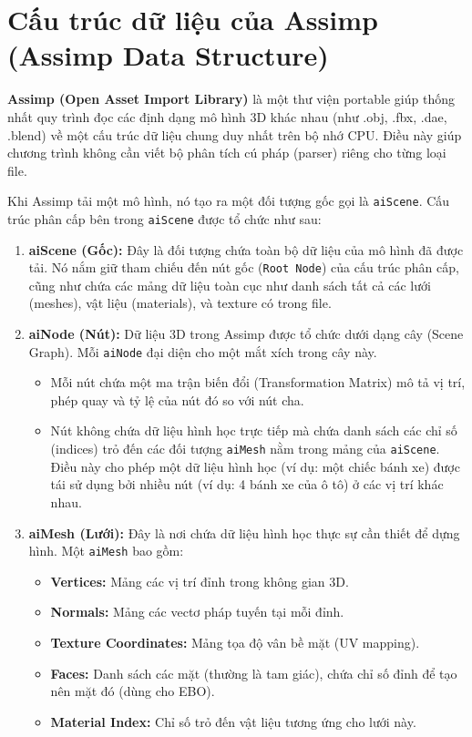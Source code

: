\section{Cấu trúc dữ liệu của Assimp (Assimp Data Structure)}

\textbf{Assimp (Open Asset Import Library)} là một thư viện portable giúp thống nhất quy trình đọc các định dạng mô hình 3D khác nhau (như .obj, .fbx, .dae, .blend) về một cấu trúc dữ liệu chung duy nhất trên bộ nhớ CPU. Điều này giúp chương trình không cần viết bộ phân tích cú pháp (parser) riêng cho từng loại file.

Khi Assimp tải một mô hình, nó tạo ra một đối tượng gốc gọi là \texttt{aiScene}. Cấu trúc phân cấp bên trong \texttt{aiScene} được tổ chức như sau:

\begin{enumerate}
	\item \textbf{aiScene (Gốc):}
	Đây là đối tượng chứa toàn bộ dữ liệu của mô hình đã được tải. Nó nắm giữ tham chiếu đến nút gốc (\texttt{Root Node}) của cấu trúc phân cấp, cũng như chứa các mảng dữ liệu toàn cục như danh sách tất cả các lưới (meshes), vật liệu (materials), và texture có trong file.
	
	\item \textbf{aiNode (Nút):}
	Dữ liệu 3D trong Assimp được tổ chức dưới dạng cây (Scene Graph). Mỗi \texttt{aiNode} đại diện cho một mắt xích trong cây này. 
	\begin{itemize}
		\item Mỗi nút chứa một ma trận biến đổi (Transformation Matrix) mô tả vị trí, phép quay và tỷ lệ của nút đó so với nút cha.
		\item Nút không chứa dữ liệu hình học trực tiếp mà chứa danh sách các chỉ số (indices) trỏ đến các đối tượng \texttt{aiMesh} nằm trong mảng của \texttt{aiScene}. Điều này cho phép một dữ liệu hình học (ví dụ: một chiếc bánh xe) được tái sử dụng bởi nhiều nút (ví dụ: 4 bánh xe của ô tô) ở các vị trí khác nhau.
	\end{itemize}
	
	\item \textbf{aiMesh (Lưới):}
	Đây là nơi chứa dữ liệu hình học thực sự cần thiết để dựng hình. Một \texttt{aiMesh} bao gồm:
	\begin{itemize}
		\item \textbf{Vertices:} Mảng các vị trí đỉnh trong không gian 3D.
		\item \textbf{Normals:} Mảng các vectơ pháp tuyến tại mỗi đỉnh.
		\item \textbf{Texture Coordinates:} Mảng tọa độ vân bề mặt (UV mapping).
		\item \textbf{Faces:} Danh sách các mặt (thường là tam giác), chứa chỉ số đỉnh để tạo nên mặt đó (dùng cho EBO).
		\item \textbf{Material Index:} Chỉ số trỏ đến vật liệu tương ứng cho lưới này.
	\end{itemize}
	

\end{enumerate}
